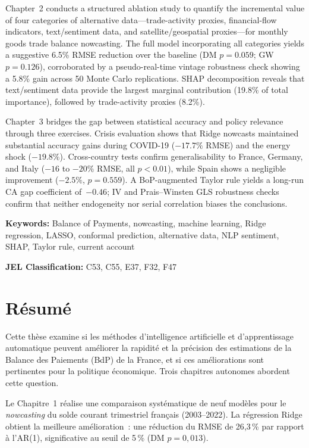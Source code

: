 \documentclass[12pt,a4paper,twoside]{report}
\begin{document}
Chapter~2 conducts a structured ablation study to quantify the incremental value of four categories of alternative data---trade-activity proxies, financial-flow indicators, text/sentiment data, and satellite/geospatial proxies---for monthly goods trade balance nowcasting.  The full model incorporating all categories yields a suggestive 6.5\% RMSE reduction over the baseline (DM $p = 0.059$; GW $p = 0.126$), corroborated by a pseudo-real-time vintage robustness check showing a 5.8\% gain across 50 Monte Carlo replications.  SHAP decomposition reveals that text/sentiment data provide the largest marginal contribution (19.8\% of total importance), followed by trade-activity proxies (8.2\%).

Chapter~3 bridges the gap between statistical accuracy and policy relevance through three exercises.  Crisis evaluation shows that Ridge nowcasts maintained substantial accuracy gains during COVID-19 ($-17.7\%$ RMSE) and the energy shock ($-19.8\%$).  Cross-country tests confirm generalisability to France, Germany, and Italy ($-16$ to $-20\%$ RMSE, all $p < 0.01$), while Spain shows a negligible improvement ($-2.5\%$, $p = 0.559$).  A BoP-augmented Taylor rule yields a long-run CA gap coefficient of~$-0.46$; IV and Prais--Winsten GLS robustness checks confirm that neither endogeneity nor serial correlation biases the conclusions.

\medskip
\noindent\textbf{Keywords:} Balance of Payments, nowcasting, machine learning, Ridge regression, LASSO, conformal prediction, alternative data, NLP sentiment, SHAP, Taylor rule, current account

\medskip
\noindent\textbf{JEL Classification:} C53, C55, E37, F32, F47

\chapter*{Résumé}

Cette thèse examine si les méthodes d'intelligence artificielle et d'apprentissage automatique peuvent améliorer la rapidité et la précision des estimations de la Balance des Paiements (BdP) de la France, et si ces améliorations sont pertinentes pour la politique économique.  Trois chapitres autonomes abordent cette question.

Le Chapitre~1 réalise une comparaison systématique de neuf modèles pour le \emph{nowcasting} du solde courant trimestriel français (2003--2022).  La régression Ridge obtient la meilleure amélioration~: une réduction du RMSE de 26{,}3\,\% par rapport à l'AR(1), significative au seuil de 5\,\% (DM $p = 0{,}013$).
\end{document}

